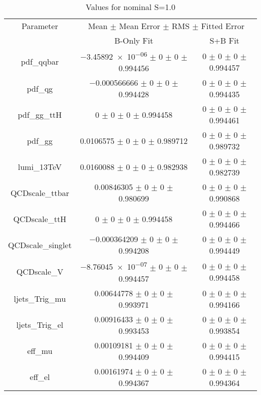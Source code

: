 \begin{table}
\centering
\caption{Values for nominal S=1.0}
\begin{tabular}{ccc}
\toprule
Parameter 	& \multicolumn{2}{c}{Mean $\pm$ Mean Error $\pm$ RMS $\pm$ Fitted Error}\\
 	& B-Only Fit & S+B Fit\\
\midrule
pdf\_qqbar 	& \num{-3.45892e-06} $\pm$ \num{0} $\pm$ \num{0} $\pm$ \num{0.994456} 	& \num{0} $\pm$ \num{0} $\pm$ \num{0} $\pm$ \num{0.994457}\\
pdf\_qg 	& \num{-0.000566666} $\pm$ \num{0} $\pm$ \num{0} $\pm$ \num{0.994428} 	& \num{0} $\pm$ \num{0} $\pm$ \num{0} $\pm$ \num{0.994435}\\
pdf\_gg\_ttH 	& \num{0} $\pm$ \num{0} $\pm$ \num{0} $\pm$ \num{0.994458} 	& \num{0} $\pm$ \num{0} $\pm$ \num{0} $\pm$ \num{0.994461}\\
pdf\_gg 	& \num{0.0106575} $\pm$ \num{0} $\pm$ \num{0} $\pm$ \num{0.989712} 	& \num{0} $\pm$ \num{0} $\pm$ \num{0} $\pm$ \num{0.989732}\\
lumi\_13TeV 	& \num{0.0160088} $\pm$ \num{0} $\pm$ \num{0} $\pm$ \num{0.982938} 	& \num{0} $\pm$ \num{0} $\pm$ \num{0} $\pm$ \num{0.982739}\\
QCDscale\_ttbar 	& \num{0.00846305} $\pm$ \num{0} $\pm$ \num{0} $\pm$ \num{0.980699} 	& \num{0} $\pm$ \num{0} $\pm$ \num{0} $\pm$ \num{0.990868}\\
QCDscale\_ttH 	& \num{0} $\pm$ \num{0} $\pm$ \num{0} $\pm$ \num{0.994458} 	& \num{0} $\pm$ \num{0} $\pm$ \num{0} $\pm$ \num{0.994466}\\
QCDscale\_singlet 	& \num{-0.000364209} $\pm$ \num{0} $\pm$ \num{0} $\pm$ \num{0.994208} 	& \num{0} $\pm$ \num{0} $\pm$ \num{0} $\pm$ \num{0.994449}\\
QCDscale\_V 	& \num{-8.76045e-07} $\pm$ \num{0} $\pm$ \num{0} $\pm$ \num{0.994457} 	& \num{0} $\pm$ \num{0} $\pm$ \num{0} $\pm$ \num{0.994458}\\
ljets\_Trig\_mu 	& \num{0.00644778} $\pm$ \num{0} $\pm$ \num{0} $\pm$ \num{0.993971} 	& \num{0} $\pm$ \num{0} $\pm$ \num{0} $\pm$ \num{0.994166}\\
ljets\_Trig\_el 	& \num{0.00916433} $\pm$ \num{0} $\pm$ \num{0} $\pm$ \num{0.993453} 	& \num{0} $\pm$ \num{0} $\pm$ \num{0} $\pm$ \num{0.993854}\\
eff\_mu 	& \num{0.00109181} $\pm$ \num{0} $\pm$ \num{0} $\pm$ \num{0.994409} 	& \num{0} $\pm$ \num{0} $\pm$ \num{0} $\pm$ \num{0.994415}\\
eff\_el 	& \num{0.00161974} $\pm$ \num{0} $\pm$ \num{0} $\pm$ \num{0.994367} 	& \num{0} $\pm$ \num{0} $\pm$ \num{0} $\pm$ \num{0.994364}\\

\end{tabular}
\end{table}
